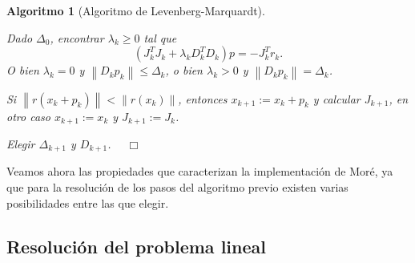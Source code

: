 \documentclass[11pt,a4paper]{book}
\newtheorem{algorithm}[theorem]{Algoritmo}
\theoremstyle{definition}
\theoremstyle{remark}
\newcommand{\norm}[1]{\left\lVert#1\right\rVert}
\begin{document}
\begin{algorithm}[Algoritmo de Levenberg-Marquardt]\leavevmode
	\label{alg:lm-more}
	\begin{steps}
		\item Dado $\Delta_0$, encontrar $\lambda_k \geq 0$ tal que
			\begin{equation*}
				(J_k^TJ_k + \lambda_k D_k^TD_k)p = -J_k^Tr_k.
			\end{equation*}
			O bien $\lambda_k = 0$ y $\norm{D_kp_k}\leq \Delta_k$, o bien $\lambda_k > 0$ y
			$\norm{D_kp_k}=\Delta_k$.
		\item Si $\norm{r(x_k+p_k)}<\norm{r(x_k)}$, entonces $x_{k+1}:=x_k+p_k$ y
			calcular $J_{k+1}$, en otro caso $x_{k+1}:=x_k$ y $J_{k+1}:=J_k$.
		\item Elegir $\Delta_{k+1}$ y $D_{k+1}$. $\quad \Box$
	\end{steps}
\end{algorithm}

Veamos ahora las propiedades que caracterizan la implementación de Moré, ya que para la resolución
de los pasos del algoritmo previo existen varias posibilidades entre las que elegir.

\subsection{Resolución del problema lineal}
\end{document}
